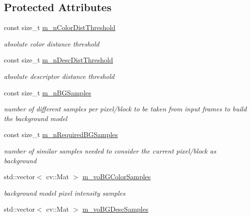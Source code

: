 \subsection*{Protected Attributes}
\begin{DoxyCompactItemize}
\item 
const size\+\_\+t \mbox{\hyperlink{class_background_subtractor_l_o_b_s_t_e_r_a37a37a0a46fc8e33d954c33c1318d7b2}{m\+\_\+n\+Color\+Dist\+Threshold}}
\begin{DoxyCompactList}\small\item\em absolute color distance threshold \end{DoxyCompactList}\item 
const size\+\_\+t \mbox{\hyperlink{class_background_subtractor_l_o_b_s_t_e_r_abe3f4a836343e901746e4f243f5252e4}{m\+\_\+n\+Desc\+Dist\+Threshold}}
\begin{DoxyCompactList}\small\item\em absolute descriptor distance threshold \end{DoxyCompactList}\item 
const size\+\_\+t \mbox{\hyperlink{class_background_subtractor_l_o_b_s_t_e_r_a20c53540b952d608d849a305fd5eed89}{m\+\_\+n\+B\+G\+Samples}}
\begin{DoxyCompactList}\small\item\em number of different samples per pixel/block to be taken from input frames to build the background model \end{DoxyCompactList}\item 
const size\+\_\+t \mbox{\hyperlink{class_background_subtractor_l_o_b_s_t_e_r_acb558aefc1b6205a63c1906b6fd1eeff}{m\+\_\+n\+Required\+B\+G\+Samples}}
\begin{DoxyCompactList}\small\item\em number of similar samples needed to consider the current pixel/block as \textquotesingle{}background\textquotesingle{} \end{DoxyCompactList}\item 
std\+::vector$<$ cv\+::\+Mat $>$ \mbox{\hyperlink{class_background_subtractor_l_o_b_s_t_e_r_ac981b39f8ae7b28d3e4326d8e6be6332}{m\+\_\+vo\+B\+G\+Color\+Samples}}
\begin{DoxyCompactList}\small\item\em background model pixel intensity samples \end{DoxyCompactList}\item 
std\+::vector$<$ cv\+::\+Mat $>$ \mbox{\hyperlink{class_background_subtractor_l_o_b_s_t_e_r_a3c49866ae652423b2173215957907d04}{m\+\_\+vo\+B\+G\+Desc\+Samples}}

\end{DoxyCompactItemize}
